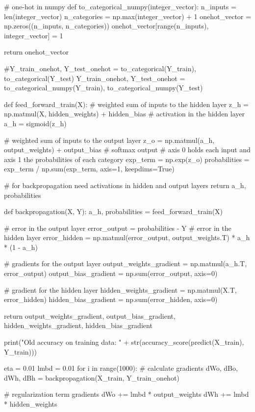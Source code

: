 \documentclass[%
oneside,                 %
final,                   %
10pt]{article}
\begin{document}
# one-hot in numpy
def to_categorical_numpy(integer_vector):
    n_inputs = len(integer_vector)
    n_categories = np.max(integer_vector) + 1
    onehot_vector = np.zeros((n_inputs, n_categories))
    onehot_vector[range(n_inputs), integer_vector] = 1
    
    return onehot_vector

#Y_train_onehot, Y_test_onehot = to_categorical(Y_train), to_categorical(Y_test)
Y_train_onehot, Y_test_onehot = to_categorical_numpy(Y_train), to_categorical_numpy(Y_test)

def feed_forward_train(X):
    # weighted sum of inputs to the hidden layer
    z_h = np.matmul(X, hidden_weights) + hidden_bias
    # activation in the hidden layer
    a_h = sigmoid(z_h)
    
    # weighted sum of inputs to the output layer
    z_o = np.matmul(a_h, output_weights) + output_bias
    # softmax output
    # axis 0 holds each input and axis 1 the probabilities of each category
    exp_term = np.exp(z_o)
    probabilities = exp_term / np.sum(exp_term, axis=1, keepdims=True)
    
    # for backpropagation need activations in hidden and output layers
    return a_h, probabilities

def backpropagation(X, Y):
    a_h, probabilities = feed_forward_train(X)
    
    # error in the output layer
    error_output = probabilities - Y
    # error in the hidden layer
    error_hidden = np.matmul(error_output, output_weights.T) * a_h * (1 - a_h)
    
    # gradients for the output layer
    output_weights_gradient = np.matmul(a_h.T, error_output)
    output_bias_gradient = np.sum(error_output, axis=0)
    
    # gradient for the hidden layer
    hidden_weights_gradient = np.matmul(X.T, error_hidden)
    hidden_bias_gradient = np.sum(error_hidden, axis=0)

    return output_weights_gradient, output_bias_gradient, hidden_weights_gradient, hidden_bias_gradient

print("Old accuracy on training data: " + str(accuracy_score(predict(X_train), Y_train)))

eta = 0.01
lmbd = 0.01
for i in range(1000):
    # calculate gradients
    dWo, dBo, dWh, dBh = backpropagation(X_train, Y_train_onehot)
    
    # regularization term gradients
    dWo += lmbd * output_weights
    dWh += lmbd * hidden_weights
    
\end{document}
